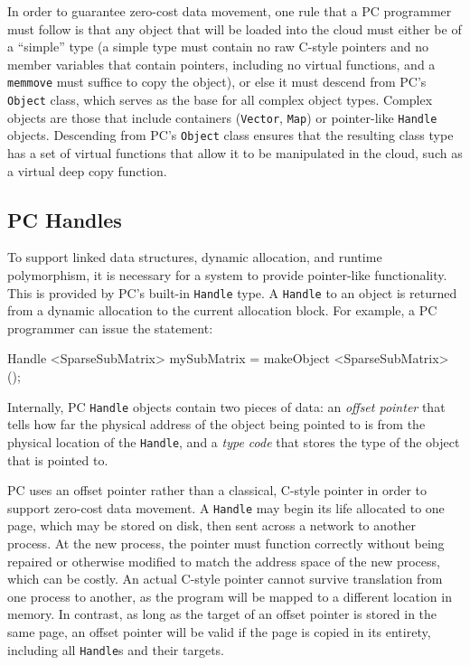 In order to guarantee zero-cost data movement,
one rule that a PC programmer must follow is that any object that will be loaded into the cloud must either be of a ``simple'' type (a simple type
must contain no raw C-style pointers and no member variables that contain pointers, including no 
virtual functions, and a \texttt{memmove}
must suffice to copy the object), or else it must descend from PC's \texttt{Object} class, which serves as the base for all complex object types.
Complex objects are those that include containers (\texttt{Vector}, \texttt{Map}) or pointer-like \texttt{Handle} objects.  Descending from PC's \texttt{Object} class
ensures that the resulting class type has a set of virtual functions that allow it to be manipulated in the cloud, 
such as a virtual deep copy function.  

\subsection{PC Handles}

To support linked data structures, dynamic allocation, and runtime polymorphism, it is necessary for a 
system to provide pointer-like functionality.  This is provided by PC's built-in \texttt{Handle} type.  
A \texttt{Handle} to an object is returned from a dynamic allocation to the current allocation block.
For example, a PC programmer 
can issue the statement:

\begin{code}
Handle <SparseSubMatrix> mySubMatrix = makeObject <SparseSubMatrix> ();
\end{code}

Internally, PC \texttt{Handle} objects contain two pieces of data: an \emph{offset pointer} that tells how far
the physical address of the object being pointed to is from the physical location of the 
\texttt{Handle}, and a \emph{type code} that stores the type of the
object that is pointed to.  

PC uses an offset pointer rather than a classical, C-style pointer in order to support
zero-cost data movement.  
A \texttt{Handle} may begin its life allocated
to one page, which may be stored on disk, then sent across a network to another process.  At the new process, the pointer
must function correctly without being repaired or otherwise modified to match the address space of the new process, which can be costly.  
An actual C-style pointer
cannot survive translation from one process to another, as the program will be mapped to a different location in memory.
In contrast, as long as the target of an offset pointer is stored in the same page, an offset pointer will be valid if the
page is copied in its entirety, including all \texttt{Handle}s and their targets.

